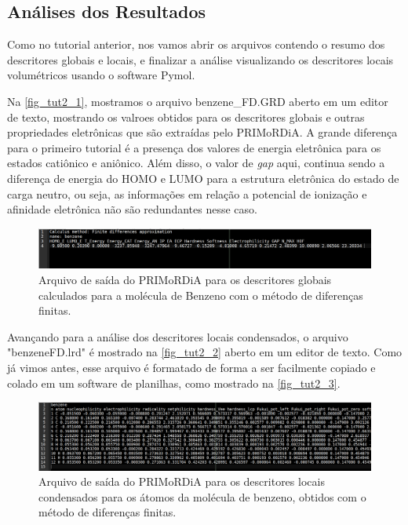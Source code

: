 \documentclass[a4paper,11pt]{refart}
\begin{document}
\subsection{Análises dos Resultados}

Como no tutorial anterior, nos vamos abrir os arquivos contendo o resumo dos descritores globais e locais, e finalizar a análise visualizando os descritores locais volumétricos usando o software Pymol. 

Na \autoref{fig_tut2_1}, mostramos o arquivo benzene\_FD.GRD aberto em um editor de texto, mostrando os valroes obtidos para os descritores globais e outras propriedades eletrônicas que são extraídas pelo PRIMoRDiA. A grande diferença para o primeiro tutorial é a presença dos valores de energia eletrônica para os estados catiônico e aniônico. Além disso, o valor de \emph{gap} aqui, continua sendo a diferença de energia do HOMO e LUMO para a estrutura eletrônica do estado de carga neutro, ou seja, as informações em relação a potencial de ionização e afinidade eletrônica não são redundantes nesse caso.  

\hspace*{-\leftmarginwidth}
\begin{minipage}{\fullwidth}
	\begin{figure}[H]
		\begin{center}
			\includegraphics[width=7in]{images/tut2_img2}
			\caption{Arquivo de saída do PRIMoRDiA para os descritores globais calculados para a molécula de Benzeno com o método de diferenças finitas.}
			\label{fig_tut2_1}
		\end{center}
	\end{figure}
\end{minipage}

Avançando para a análise dos descritores locais condensados, o arquivo "benzeneFD.lrd" é mostrado na \autoref{fig_tut2_2} aberto em um editor de texto. Como já vimos antes, esse arquivo é formatado de forma a ser facilmente copiado e colado em um software de planilhas, como mostrado na \autoref{fig_tut2_3}.

\hspace*{-\leftmarginwidth}
\begin{minipage}{\fullwidth}
	\begin{figure}[H]
		\begin{center}
			\includegraphics[width=7in]{images/tut2_img3}
			\caption{Arquivo de saída do PRIMoRDiA para os descritores locais condensados para os átomos da molécula de benzeno, obtidos com o método de diferenças finitas.}
			\label{fig_tut2_2}
		\end{center}
	\end{figure}
\end{minipage}
\end{document}
